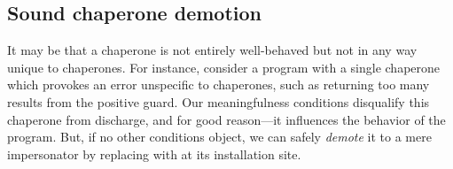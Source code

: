 




\subsection{Sound chaperone demotion}

It may be that a chaperone is not entirely well-behaved but not in any way unique to chaperones.
For instance, consider a program with a single chaperone which provokes an error unspecific to chaperones, such as returning too many results from the positive guard.
Our meaningfulness conditions disqualify this chaperone from discharge, and for good reason---it influences the behavior of the program.
But, if no other conditions object, we can safely \emph{demote} it to a mere impersonator by replacing  with  at its installation site.

